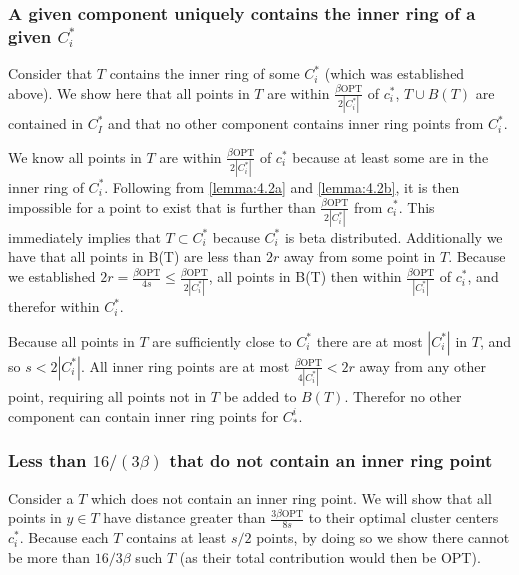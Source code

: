\documentclass[paper=a4, fontsize=10.5pt]{scrartcl} %
\numberwithin{equation}{section} %
\numberwithin{figure}{section} %
\numberwithin{table}{section} %
\begin{document}
\subsubsection{A given component uniquely contains the inner ring of a given $C^*_i$}

Consider that $T$ contains the inner ring of some $C^*_i$ (which was established above). We show here that all points in $T$ are within $\frac{\beta\text{OPT}}{2|C^*_i|}$ of $c_i^*$, $T \cup B(T)$ are contained in $C_I^*$ and that no other component contains inner ring points from $C^*_i$.

We know all points in $T$ are within $\frac{\beta\text{OPT}}{2|C^*_i|}$ of $c_i^*$ because at least some are in the inner ring of $C^*_i$. Following from \ref{lemma:4.2a} and \ref{lemma:4.2b}, it is then impossible for a point to exist that is further than $\frac{\beta\text{OPT}}{2|C^*_i|}$ from $c_i^*$. This immediately implies that $T \subset C_i^*$ because $C_i^*$ is beta distributed. Additionally we have that all points in B(T) are less than $2r$ away from some point in $T$. Because we established $2r = \frac{\beta\text{OPT}}{4s} \leq \frac{\beta\text{OPT}}{2|C_i^*|}$, all points in B(T) then within $ \frac{\beta\text{OPT}}{|C_i^*|}$ of $c_i^*$, and therefor within $C_i^*$. 

Because all points in $T$ are sufficiently close to $C_i^*$ there are at most $|C_i^*|$ in $T$, and so $s < 2|C_i^*|$. All inner ring points are at most $\frac{\beta\text{OPT}}{4|C^*_i|} < 2r$ away from any other point, requiring all points not in $T$ be added to $B(T)$. Therefor no other component can contain inner ring points for $C_*^i$.


\subsubsection{Less than $16/(3\beta)$ that do not contain an inner ring point}

Consider a $T$ which does not contain an inner ring point. We will show that all points in $y \in T$ have distance greater than $\frac{3\beta\text{OPT}}{8s}$ to their optimal cluster centers $c_i^*$. Because each $T$ contains at least $s/2$ points, by doing so we show there cannot be more than $16/3\beta$ such $T$ (as their total contribution would then be OPT).
\end{document}
